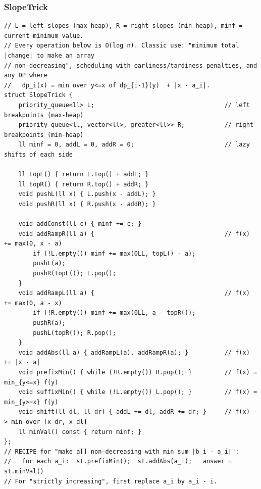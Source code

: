 \documentclass[9pt,a4paper,twocolumn]{extarticle}
\begin{document}
\subsubsection{SlopeTrick}
\nopagebreak
\begin{lstlisting}
// L = left slopes (max-heap), R = right slopes (min-heap), minf = current minimum value.
// Every operation below is O(log n). Classic use: "minimum total |change| to make an array
// non-decreasing", scheduling with earliness/tardiness penalties, and any DP where
//   dp_i(x) = min over y<=x of dp_{i-1}(y)  + |x - a_i|.
struct SlopeTrick {
    priority_queue<ll> L;                                    // left breakpoints (max-heap)
    priority_queue<ll, vector<ll>, greater<ll>> R;           // right breakpoints (min-heap)
    ll minf = 0, addL = 0, addR = 0;                         // lazy shifts of each side

    ll topL() { return L.top() + addL; }
    ll topR() { return R.top() + addR; }
    void pushL(ll x) { L.push(x - addL); }
    void pushR(ll x) { R.push(x - addR); }

    void addConst(ll c) { minf += c; }
    void addRampR(ll a) {                                    // f(x) += max(0, x - a)
        if (!L.empty()) minf += max(0LL, topL() - a);
        pushL(a);
        pushR(topL()); L.pop();
    }
    void addRampL(ll a) {                                    // f(x) += max(0, a - x)
        if (!R.empty()) minf += max(0LL, a - topR());
        pushR(a);
        pushL(topR()); R.pop();
    }
    void addAbs(ll a) { addRampL(a), addRampR(a); }          // f(x) += |x - a|
    void prefixMin() { while (!R.empty()) R.pop(); }         // f(x) = min_{y<=x} f(y)
    void suffixMin() { while (!L.empty()) L.pop(); }         // f(x) = min_{y>=x} f(y)
    void shift(ll dl, ll dr) { addL += dl, addR += dr; }     // f(x) -> min over [x-dr, x-dl]
    ll minVal() const { return minf; }
};
// RECIPE for "make a[] non-decreasing with min sum |b_i - a_i|":
//   for each a_i:  st.prefixMin();  st.addAbs(a_i);   answer = st.minVal()
// For "strictly increasing", first replace a_i by a_i - i.
\end{lstlisting}

\filbreak
\end{document}
